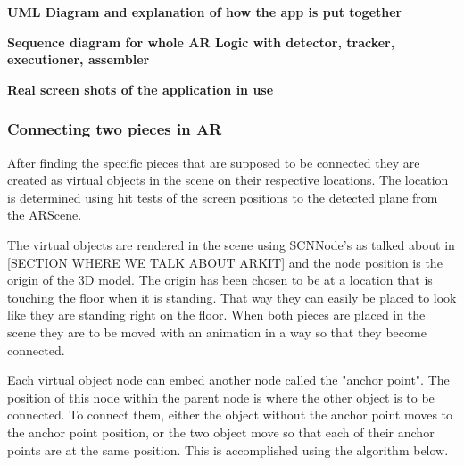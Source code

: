\textbf{UML Diagram and explanation of how the app is put together}

\textbf{Sequence diagram for whole AR Logic with detector, tracker, executioner, assembler}

\textbf{Real screen shots of the application in use}



\subsubsection{Connecting two pieces in AR}
After finding the specific pieces that are supposed to be connected they are created as
virtual objects in the scene on their respective locations. The location is determined using
hit tests of the screen positions to the detected plane from the ARScene.

The virtual objects are rendered in the scene using SCNNode's as talked about in [SECTION WHERE WE TALK ABOUT ARKIT] and the node position is the origin of the 3D model. The origin has been chosen to be at a location that is touching the floor when it is standing. That way they can easily be placed to look like they are standing right on the floor.
When both pieces are placed in the scene they are to be moved with an animation in a way so that they become connected.

Each virtual object node can embed another node called the "anchor point". The position of this node within the parent node is where the other object is to be connected. To connect them, either the object without the anchor point moves to the anchor point position, or the two object move so that each of their anchor points are at the same position.
This is accomplished using the algorithm below.

